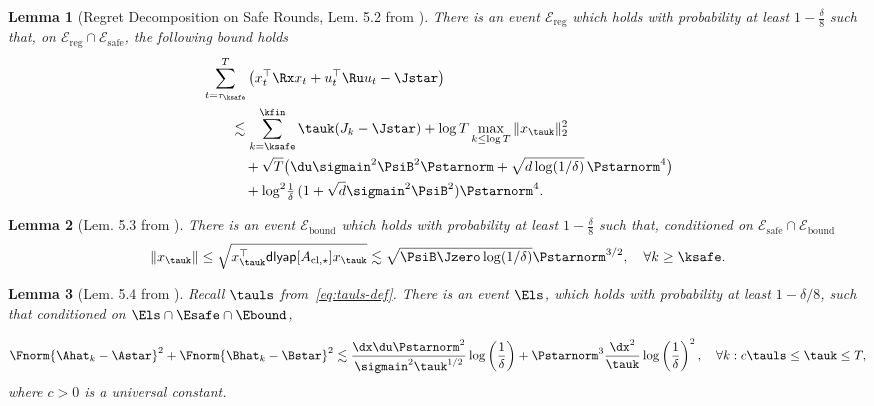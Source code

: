\documentclass[11pt,journal,onecolumn]{IEEEtran}
\newtheorem{lemma}{Lemma}
\begin{document}
\begin{lemma}[Regret Decomposition on Safe Rounds, Lem. 5.2 from \cite{simchowitz20a}]
    There is an event $\mathcal{E}_{\mathrm{reg}}$ which holds with probability at least $1 - \frac{\delta}{8}$ such that, on $\mathcal{E}_{\mathrm{reg}} \cap \mathcal{E}_{\mathrm{safe}}$, the following bound holds
    \begin{equation} \label{regredecomp}
        \begin{split}
            &\sum_{t=\tau_{\ksafe}}^{T} \big(x_t^\top \Rx x_t + u_t^\top \Ru u_t - \Jstar\big) \\
            &\qquad\lesssim \sum_{k=\ksafe}^{\kfin} \tauk (J_k - \Jstar) + \log T \max_{k \le \log T} \|x_{\tauk}\|_2^2 \\
            &\qquad\quad + \sqrt{T} \big( \du \sigmain^2 \PsiB^2 \Pstarnorm + \sqrt{d \log(1/\delta)}\,\Pstarnorm^4 \big) \\
            &\qquad\quad + \log^2 \!\tfrac{1}{\delta}\, (1 + \sqrt{d} \sigmain^2 \PsiB^2) \Pstarnorm^4.
        \end{split}
    \end{equation}
\end{lemma}

\begin{lemma}[Lem. 5.3 from \cite{simchowitz20a}]
    There is an event $\mathcal{E}_{\mathrm{bound}}$ which holds with probability at least $1 - \frac{\delta}{8}$ such that, conditioned on $\mathcal{E}_{\mathrm{safe}} \cap \mathcal{E}_{\mathrm{bound}}$
    \begin{equation}
        \|x_{\tauk}\| \le \sqrt{x_{\tauk}^\top \mathsf{dlyap}[A_{\mathrm{cl},\star}] x_{\tauk}} \lesssim \sqrt{\PsiB \Jzero \log(1/\delta)} \Pstarnorm^{3/2}, \quad \forall k \ge \ksafe.
    \end{equation}
\end{lemma}

\begin{lemma}[Lem. 5.4 from \cite{simchowitz20a}]
    Recall $\tauls$ from~\eqref{eq:tauls-def}. There is an event $\Els$, which holds with probability at least $1 - \delta/8$, such that conditioned on $\Els \cap \Esafe \cap \Ebound$,

    \begin{equation}
        \label{OLSrate}
        \Fnorm{\Ahat_k - \Astar}^2 + \Fnorm{\Bhat_k - \Bstar}^2 \lesssim \frac{\dx\du\Pstarnorm^2}{\sigmain^2 \tauk^{1/2}} \log\left(\frac{1}{\delta}\right) + \Pstarnorm^3 \frac{\dx^2}{\tauk} \log\left(\frac{1}{\delta}\right)^2, \quad \forall k : c \tauls \le \tauk \le T,
    \end{equation}
    where $c > 0$ is a universal constant.
\end{lemma}
\end{document}

